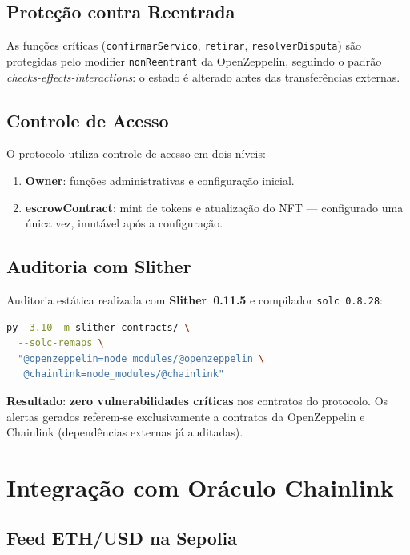 \documentclass[
    12pt,
    a4paper,
    oneside,
    brazil,
    sumario=tradicional
]{abntex2}
\begin{document}
\subsection{Proteção contra Reentrada}

As funções críticas (\texttt{confirmarServico}, \texttt{retirar},
\texttt{resolverDisputa}) são protegidas pelo modifier
\texttt{nonReentrant} da OpenZeppelin, seguindo o padrão
\textit{checks-effects-interactions}: o estado é alterado antes das
transferências externas.

\subsection{Controle de Acesso}

O protocolo utiliza controle de acesso em dois níveis:
\begin{enumerate}
    \item \textbf{Owner}: funções administrativas e configuração
    inicial.
    \item \textbf{escrowContract}: mint de tokens e atualização do
    NFT --- configurado uma única vez, imutável após a
    configuração.
\end{enumerate}

\subsection{Auditoria com Slither}

Auditoria est\'atica realizada com \textbf{Slither~0.11.5} e compilador
\texttt{solc~0.8.28}:

\begin{lstlisting}[language=bash, caption={Comando de auditoria}]
py -3.10 -m slither contracts/ \
  --solc-remaps \
  "@openzeppelin=node_modules/@openzeppelin \
   @chainlink=node_modules/@chainlink"
\end{lstlisting}

\textbf{Resultado}: \textbf{zero vulnerabilidades críticas} nos contratos
do protocolo. Os alertas gerados referem-se exclusivamente a contratos da
OpenZeppelin e Chainlink (dependências externas já auditadas).

\section{Integração com Oráculo Chainlink}

\subsection{Feed ETH/USD na Sepolia}
\end{document}
